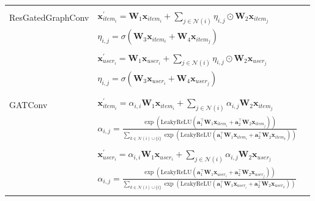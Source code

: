 \documentclass[bst/sn-nature]{sn-jnl}
\begin{document}
\begin{appendices}
\begin{longtable}{|l|l|l|}
     & \\
    ResGatedGraphConv & $\mathbf{x}^{\prime}_{item_{i}} = \mathbf{W}_1 \mathbf{x}_{item_{i}} + \sum_{j \in \mathcal{N}(i)} \eta_{i,j} \odot \mathbf{W}_2 \mathbf{x}_{item_{j}}$\\
    & $\eta_{i,j} = \sigma(\mathbf{W}_3 \mathbf{x}_{item_{i}} + \mathbf{W}_4 \mathbf{x}_{item_{j}})$  \\
     & \\
    & $\mathbf{x}^{\prime}_{user_{i}} = \mathbf{W}_1 \mathbf{x}_{user_{i}} + \sum_{j \in \mathcal{N}(i)} \eta_{i,j} \odot \mathbf{W}_2 \mathbf{x}_{user_{j}}$\\
    & $\eta_{i,j} = \sigma(\mathbf{W}_3 \mathbf{x}_{user_{i}} + \mathbf{W}_4 \mathbf{x}_{user_{j}})$ \\
     & \\
    
    \rowcolor[gray]{0.9} & \\
    \rowcolor[gray]{0.9} GATConv & $\mathbf{x}^{\prime}_{item_{i}} = \alpha_{i,i}\mathbf{W}_{1}\mathbf{x}_{item_{i}} + \sum_{j \in \mathcal{N}(i)} \alpha_{i,j}\mathbf{W}_{2}\mathbf{x}_{item_{j}}$ \\
    \rowcolor[gray]{0.9} & $\alpha_{i,j} = \frac{\exp\left(\mathrm{LeakyReLU}\left(\mathbf{a}^{\top}_{1} \mathbf{W}_{1}\mathbf{x}_{item_{i}} + \mathbf{a}^{\top}_{2} \mathbf{W}_{2}\mathbf{x}_{item_{j}}\right)\right)}{\sum_{k \in \mathcal{N}(i) \cup \{ i \}}\exp\left(\mathrm{LeakyReLU}\left(\mathbf{a}^{\top}_{1} \mathbf{W}_{1}\mathbf{x}_{item_{i}} + \mathbf{a}^{\top}_{2}\mathbf{W}_{2}\mathbf{x}_{item_{k}}\right)\right)}$ \\
    \rowcolor[gray]{0.9} & \\
    \rowcolor[gray]{0.9} & $\mathbf{x}^{\prime}_{user_{i}} = \alpha_{i,i}\mathbf{W}_{1}\mathbf{x}_{user_{i}} + \sum_{j \in \mathcal{N}(i)} \alpha_{i,j}\mathbf{W}_{2}\mathbf{x}_{user_{j}}$ \\
    \rowcolor[gray]{0.9} & $\alpha_{i,j} = \frac{\exp\left(\mathrm{LeakyReLU}\left(\mathbf{a}^{\top}_{1} \mathbf{W}_{1}\mathbf{x}_{user_{i}} + \mathbf{a}^{\top}_{2} \mathbf{W}_{2}\mathbf{x}_{user_{j}}\right)\right)}{\sum_{k \in \mathcal{N}(i) \cup \{ i \}}\exp\left(\mathrm{LeakyReLU}\left(\mathbf{a}^{\top}_{1} \mathbf{W}_{1}\mathbf{x}_{user_{i}} + \mathbf{a}^{\top}_{2}\mathbf{W}_{2}\mathbf{x}_{user_{k}}\right)\right)}$ \\
    \rowcolor[gray]{0.9} & \\


\end{longtable}
\end{appendices}
\end{document}
